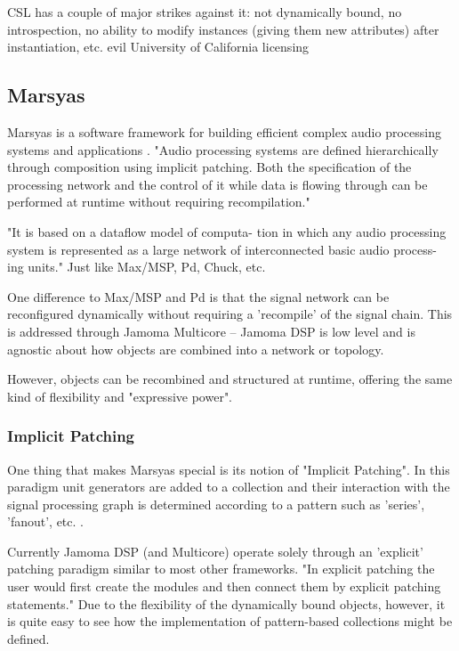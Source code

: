 \documentclass[twoside,10pt]{article}
\begin{document}
CSL has a couple of major strikes against it:   not dynamically bound, no introspection, no ability to modify instances (giving them new attributes) after instantiation, etc. evil University of California licensing


\subsection{Marsyas} %

Marsyas is a software framework for building efficient complex audio processing systems and applications \cite{Tzanetakis:2008}. "Audio processing systems are defined hierarchically through composition using implicit patching. Both the specification of the processing network and the control of it while data is flowing through can be performed at runtime without requiring recompilation."

"It is based on a dataflow model of computa- tion in which any audio processing system is represented as a large network of interconnected basic audio process- ing units."  Just like Max/MSP, Pd, Chuck, etc.

One difference to Max/MSP and Pd is that the signal network can be reconfigured dynamically without requiring a 'recompile' of the signal chain.  This is addressed through Jamoma Multicore -- Jamoma DSP is low level and is agnostic about how objects are combined into a network or topology.

However, objects can be recombined and structured at runtime, offering the same kind of flexibility and "expressive power".

\subsubsection{Implicit Patching}

One thing that makes Marsyas special is its notion of "Implicit Patching".  In this paradigm unit generators are added to a collection and their interaction with the signal processing graph is determined according to a pattern such as 'series', 'fanout', etc. \cite{Bray:2005}.

Currently Jamoma DSP (and Multicore) operate solely through an 'explicit' patching paradigm similar to most other frameworks.  "In explicit patching the user would first create the modules and then connect them by explicit patching statements."  Due to the flexibility of the dynamically bound objects, however, it is quite easy to see how the implementation of pattern-based collections might be defined.
\end{document}
